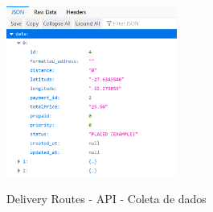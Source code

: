 \begin{figure}[H]
    \centering
    \caption{Delivery Routes - API - Coleta de dados}
    \includegraphics[width=0.5\textwidth]{./dados/figuras/fig14}
    \label{fig:drPlacedAPI}
\end{figure}
